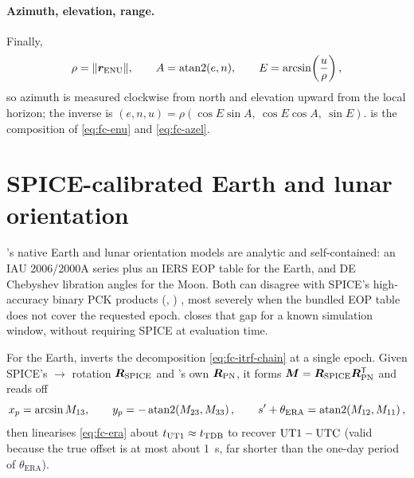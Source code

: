 \paragraph{Azimuth, elevation, range.} Finally,
%
\begin{equation}
  \label{eq:fc-azel}
  \rho = \lVert\bm{r}_{\mathrm{ENU}}\rVert, \qquad
  A = \operatorname{atan2}(e, n), \qquad
  E = \arcsin\!\left(\frac{u}{\rho}\right),
\end{equation}
%
so azimuth is measured clockwise from north and elevation upward from the
local horizon; the inverse is
$(e,n,u) = \rho(\cos E\sin A,\ \cos E\cos A,\ \sin E)$.
 is the composition of \cref{eq:fc-enu} and
\cref{eq:fc-azel}.

\section{SPICE-calibrated Earth and lunar orientation}
\label{sec:fc-spicefit}

\lupnt{}'s native Earth and lunar orientation models are analytic and
self-contained: an IAU 2006/2000A series plus an IERS EOP table for the
Earth, and DE Chebyshev libration angles for the Moon. Both can disagree
with SPICE's high-accuracy binary PCK products
(, )
\citep{acton1996spice}, most severely when the bundled EOP table does not
cover the requested epoch.  closes that
gap for a known simulation window, without requiring SPICE at evaluation
time.

For the Earth,  inverts the decomposition
\cref{eq:fc-itrf-chain} at a single epoch. Given SPICE's
$\to$ rotation $\bm{R}_{\mathrm{SPICE}}$ and
\lupnt{}'s own $\bm{R}_{\mathrm{PN}}$, it forms
$\bm{M} = \bm{R}_{\mathrm{SPICE}}\bm{R}_{\mathrm{PN}}^{\mathsf{T}}$ and reads
off
%
\begin{equation}
  \label{eq:fc-eopinv}
  x_p = \arcsin M_{13}, \qquad
  y_p = -\operatorname{atan2}\!\left(M_{23}, M_{33}\right), \qquad
  s' + \theta_{\mathrm{ERA}} = \operatorname{atan2}\!\left(M_{12}, M_{11}\right),
\end{equation}
%
then linearises \cref{eq:fc-era} about $t_{\mathrm{UT1}}\approx t_{\mathrm{TDB}}$ to
recover $\mathrm{UT1}-\mathrm{UTC}$ (valid because the true offset is at most about
\SI{1}{\second}, far shorter than the one-day period of
$\theta_{\mathrm{ERA}}$).

